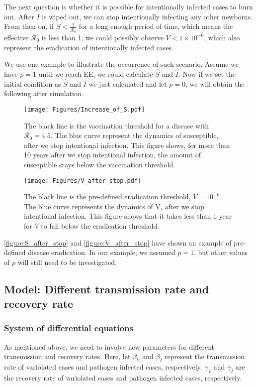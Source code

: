 \documentclass[12pt]{article}
\newcommand{\R}{\mathcal{R}}
\begin{document}
The next question is whether it is possible for intentionally infected cases to burn out. After $I$ is wiped out, we can stop intentionally infecting any other newborns. From then on, if $S<\frac{1}{\R_0}$ for a long enough period of time, which means the effective $\R_0$ is less than 1, we could possibly observe $V<1\times10^{-6}$, which also represent the eradication of intentionally infected cases.

We use one example to illustrate the occurrence of such scenario. Assume we have $p=1$ until we reach EE, we could calculate $\hat{S}$ and $\hat{I}$. Now if we set the initial condition as $\hat{S}$ and $\hat{I}$ we just calculated and let $p=0$, we will obtain the following after simulation.
\begin{figure}[H]
  \centering
  \texttt{[image: Figures/Increase\_of\_S.pdf]}
  \caption{The black line is the vaccination threshold for a disease with $\R_0=4.5$. The blue curve represent the dynamics of susceptible, after we stop intentional infection. This figure shows, for more than 10 years after we stop intentional infection, the amount of susceptible stays below the vaccination threshold.}
\label{figure:S_after_stop}
\end{figure}

\begin{figure}[H]
  \centering
  \texttt{[image: Figures/V\_after\_stop.pdf]}
  \caption{The black line is the pre-defined eradication threshold, $V=10^{-6}$. The blue curve represents the dynamics of V, after we stop intentional infection. This figure shows that it takes less than 1 year for $V$ to fall below the eradication threshold.}
\label{figure:V_after_stop}
\end{figure}

\autoref{figure:S_after_stop} and \autoref{figure:V_after_stop} have shown an example of pre-defined disease eradication. In our example, we assumed $p=1$, but other values of $p$ will still need to be investigated.

\subsection{Model: Different transmission rate and recovery rate}
\subsubsection{System of differential equations}
As mentioned above, we need to involve new parameters for different transmission and recovery rates. Here, let $\beta_V$ and $\beta_I$ represent the transmission rate of variolated cases and pathogen infected cases, respectively. $\gamma_V$ and $\gamma_I$ are the recovery rate of variolated cases and pathogen infected cases, respectively.
\end{document}
